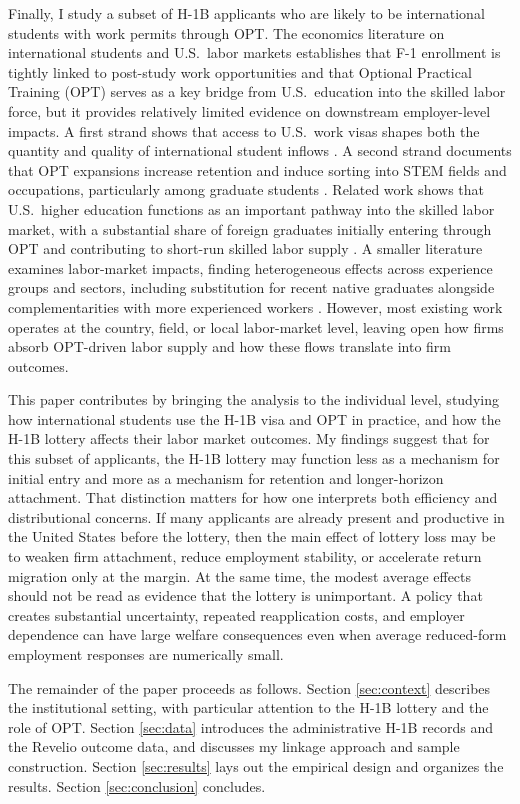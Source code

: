 Finally, I study a subset of H-1B applicants who are likely to be international students with work permits through OPT. The economics literature on international students and U.S.\ labor markets establishes that F-1 enrollment is tightly linked to post-study work opportunities and that Optional Practical Training (OPT) serves as a key bridge from U.S.\ education into the skilled labor force, but it provides relatively limited evidence on downstream employer-level impacts. A first strand shows that access to U.S.\ work visas shapes both the quantity and quality of international student inflows \citep{kato_sparber_2013, shih_2016}. A second strand documents that OPT expansions increase retention and induce sorting into STEM fields and occupations, particularly among graduate students \citep{amuedo_dorantes_furtado_xu_2019, demirci_2019, amuedo_dorantes_shih_xu_2023}. Related work shows that U.S.\ higher education functions as an important pathway into the skilled labor market, with a substantial share of foreign graduates initially entering through OPT and contributing to short-run skilled labor supply \citep{bound_demirci_khanna_turner_2015, beine_bertoli_fernandes_2023}. A smaller literature examines labor-market impacts, finding heterogeneous effects across experience groups and sectors, including substitution for recent native graduates alongside complementarities with more experienced workers \citep{demirci_2020, amuedo_dorantes_furtado_2019}. However, most existing work operates at the country, field, or local labor-market level, leaving open how firms absorb OPT-driven labor supply and how these flows translate into firm outcomes. 

This paper contributes by bringing the analysis to the individual level, studying how international students use the H-1B visa and OPT in practice, and how the H-1B lottery affects their labor market outcomes. My findings suggest that for this subset of applicants, the H-1B lottery may function less as a mechanism for initial entry and more as a mechanism for retention and longer-horizon attachment. That distinction matters for how one interprets both efficiency and distributional concerns. If many applicants are already present and productive in the United States before the lottery, then the main effect of lottery loss may be to weaken firm attachment, reduce employment stability, or accelerate return migration only at the margin. At the same time, the modest average effects should not be read as evidence that the lottery is unimportant. A policy that creates substantial uncertainty, repeated reapplication costs, and employer dependence can have large welfare consequences even when average reduced-form employment responses are numerically small.


The remainder of the paper proceeds as follows. Section \ref{sec:context} describes the institutional setting, with particular attention to the H-1B lottery and the role of OPT. Section \ref{sec:data} introduces the administrative H-1B records and the Revelio outcome data, and discusses my linkage approach and sample construction. Section \ref{sec:results} lays out the empirical design and organizes the results. Section \ref{sec:conclusion} concludes.
